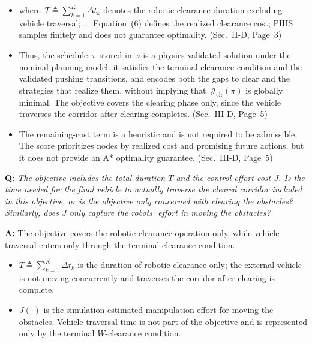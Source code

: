 \documentclass[11pt]{article}
\newcommand{\change}[1]{{\color{blue}#1}}
\begin{document}
\begin{itemize}
\item \change{where~$T\triangleq\sum_{k=1}^{K}\Delta t_k$ denotes the robotic clearance duration excluding vehicle
traversal; \dots\ Equation~(6) defines the realized clearance cost; PIHS samples finitely and does not
guarantee optimality.} (Sec.~II-D, Page~3)
\item \change{Thus, the schedule~$\pi$ stored in~$\nu$ is a physics-validated solution under the nominal planning model: it satisfies the terminal clearance condition and the validated pushing transitions, and encodes both the gaps to clear and the strategies that realize them, without implying that~$\mathcal{J}_{\mathrm{clr}}(\pi)$ is globally minimal. The objective covers the clearing phase only, since the vehicle traverses the corridor after clearing completes.} (Sec.~III-D, Page~5)
\item \change{The remaining-cost term is a heuristic and is not required to be admissible. The score prioritizes nodes by realized cost and promising future actions, but it does not provide an A* optimality guarantee.} (Sec.~III-D, Page~5)
\end{itemize}

\begin{shaded*}
\noindent \textbf{Q:}
{\itshape
The objective includes the total duration $T$ and the control-effort
cost $J$. Is the time needed for the final vehicle to actually traverse
the cleared corridor included in this objective, or is the objective
only concerned with clearing the obstacles? Similarly, does $J$ only
capture the robots' effort in moving the obstacles?
}
\end{shaded*}

\noindent \textbf{A:}
The objective covers the robotic clearance operation only, while vehicle traversal enters only through the terminal clearance condition.

\begin{itemize}
\item $T\triangleq\sum_{k=1}^{K}\Delta t_k$ is the duration of robotic
clearance only; the external vehicle is not moving concurrently and traverses
the corridor after clearing is complete.
\item $J(\cdot)$ is the simulation-estimated manipulation effort for moving the
obstacles. Vehicle traversal time is not part of the objective and is represented
only by the terminal $W$-clearance condition.
\end{itemize}
\end{document}
